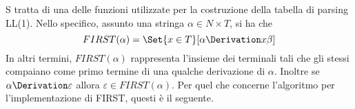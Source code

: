 \documentclass{subfiles}
\begin{document}
S tratta di una delle funzioni utilizzate per la costruzione della tabella di parsing LL(1).
Nello specifico, assunto una stringa \(\alpha \in N \times T\), si ha che
\[
    FIRST(\alpha) = \Set{x \in T}[\alpha \Derivation x\beta]
\]
In altri termini, \(FIRST(\alpha)\) rappresenta l'insieme dei terminali tali che gli stessi compaiano come primo termine di una qualche derivazione di \(\alpha\).
Inoltre se \(\alpha \Derivation \varepsilon\) allora \(\varepsilon \in FIRST(\alpha)\).
Per quel che concerne l'algoritmo per l'implementazione di FIRST, questi è il seguente.

\end{document}
